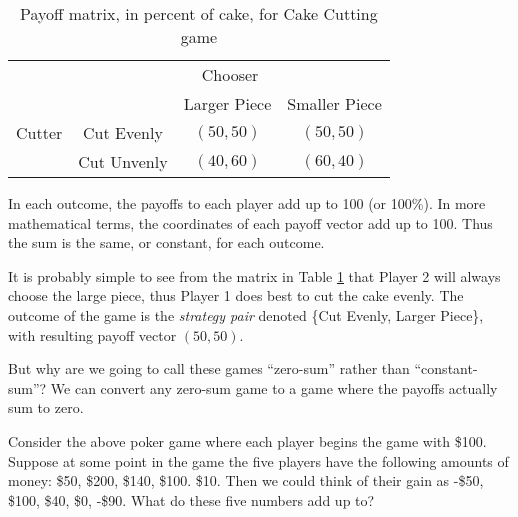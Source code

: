 \begin{example}


\begin{table}[h]
\centering

\begin{tabular}{cccc}
                      & \multicolumn{3}{c}{Chooser}                                                  \\ \cline{2-4} 
\multicolumn{1}{l|}{} & \multicolumn{1}{l|}{} & \multicolumn{1}{c|}{Larger Piece} & \multicolumn{1}{c|}{Smaller Piece} \\ \cline{2-4} 
\multicolumn{1}{l|}{Cutter} & \multicolumn{1}{c|}{Cut Evenly} & \multicolumn{1}{c|}{$(50, 50)$} & \multicolumn{1}{c|}{$(50, 50)$} \\ \cline{2-4} 
\multicolumn{1}{l|}{} & \multicolumn{1}{c|}{Cut Unvenly} & \multicolumn{1}{c|}{$(40, 60)$} & \multicolumn{1}{c|}{$(60, 40)$} \\ \cline{2-4} 
\end{tabular}
\caption{Payoff matrix, in percent of cake, for Cake Cutting game}
\label{T:cakecuttingpercent}
\end{table}



In each outcome, the payoffs to each player add up to 100 (or 100\%). In more mathematical terms, the coordinates of each payoff vector add up to 100. Thus the sum is the same, or constant, for each outcome. 
\end{example}

It is probably simple to see from the matrix in Table \ref{T:cakecuttingpercent} that Player 2 will always choose the large piece, thus Player 1 does best to cut the cake evenly. The outcome of the game is the \emph{strategy pair} denoted \{Cut Evenly, Larger Piece\}, with resulting payoff vector $(50, 50)$.


But why are we going to call these games ``zero-sum'' rather than ``constant-sum''?  We can convert any zero-sum game to a game where the payoffs actually sum to zero.

\begin{example}\label{E:pokerzero} Consider the above poker game where each player begins the game with \$100. Suppose at some point in the game  the five players have the following amounts of money: \$50, \$200, \$140, \$100. \$10. Then we could think of their gain as -\$50, \$100, \$40, \$0, -\$90. What do these five numbers add up to?
\end{example}

